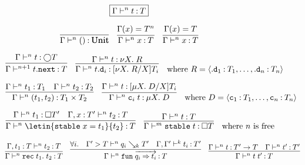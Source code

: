 \documentclass[acmsmall, natbib=false]{acmart}
\newcommand{\fun}{\mathtt{fun}}
\renewcommand{\circle}{\bigcirc}
\newcommand{\always}{\square}
\renewcommand{\next}{\mathtt{.next}}
\renewcommand{\synth}{\searrow}
\newcommand{\stable}{\mathtt{stable}}
\newcommand{\ctor}{\mathtt{c}}
\newcommand{\obs}{\mathtt{.d}}
\begin{document}
\begin{figure}[ht]
  \begin{equation*}
    \boxed{\Gamma \vdash^n t \mathbin{:} T}
  \end{equation*}

  \begin{equation*}
    \infer{
      \Gamma \proves^n () \hastype \mathqd{Unit}
    }{}
    \quad
    \infer{
      \Gamma \proves^n x \hastype T
    }{
      \Gamma(x) = T^n
    }
    \quad
    \infer{
      \Gamma \proves^n x \hastype T
    }{
      \Gamma(x) = T
    }
  \end{equation*}

  \begin{equation*}
    \infer{
      \Gamma \proves^{n+1} t\next \hastype T
    }{
      \Gamma \proves^n t \hastype \circle T
    }
    \quad
    \infer{
      \Gamma \proves^n t\mathtt{.d}_i \hastype [\nu X.\; R/X]T_i
    }{
      \Gamma \proves^n t \hastype \nu X.\; R
    }
    \quad
    \text{%
      where
      $R =
      \langle
      \obs_1 \hastype T_1, \ldots, \obs_n \hastype T_n
      \rangle$
    }
  \end{equation*}

  \begin{equation*}
    \infer{
      \Gamma \proves^n (t_1, t_2) \hastype T_1 \times T_2
    }{
      \Gamma \proves^n t_1 \hastype T_1
      &
      \Gamma \proves^n t_2 \hastype T_2
    }
    \quad
    \infer{
      \Gamma \proves^n \ctor_i\; t \hastype \mu X.\; D
    }{
      \Gamma \proves^n t \hastype [\mu X.\; D/X]T_i
    }
    \quad
    \text{%
      where $D =
      \langle
      \ctor_1 \hastype T_1, \ldots, \ctor_n \hastype T_n
      \rangle$
    }
  \end{equation*}

  \begin{equation*}
    \infer{
      \Gamma \proves^n \letin{\stable\; x = t_1}{t_2} \hastype T
    }{
      \Gamma \proves^n t_1 \hastype \always T^\prime
      &
      \Gamma, x \hastype T^\prime \proves^n t_2 \hastype T
    }
    \quad
    \infer{
      \Gamma \proves^m \stable\; t \hastype \always T
    }{
      \Gamma \proves^n t \hastype T
    }
    \quad
    \text{where $n$ is free}
  \end{equation*}

  \begin{equation*}
    \infer{
      \Gamma \proves^n \mathtt{rec}\; t_1.\; t_2 \hastype T
    }{
      \Gamma, t_1 \hastype T \proves^n t_2 \hastype T
    }
    \quad
    \infer{
      \Gamma \proves^n \fun\; \overrightarrow{q_i \goesto t_i} \hastype T
    }{
      \forall i.
      &
      \Gamma^\prime > T \proves^n q_i \synth_k T^\prime
      &
      \Gamma, \Gamma^\prime \proves^k t_i \hastype T^\prime
    }
    \quad
    \infer{
      \Gamma \proves^n t\; t^\prime \hastype T
    }{
      \Gamma \proves^n t \hastype T^\prime \to T
      &
      \Gamma \proves^n t^\prime \hastype T^\prime
    }
  \end{equation*}


\end{figure}
\end{document}
